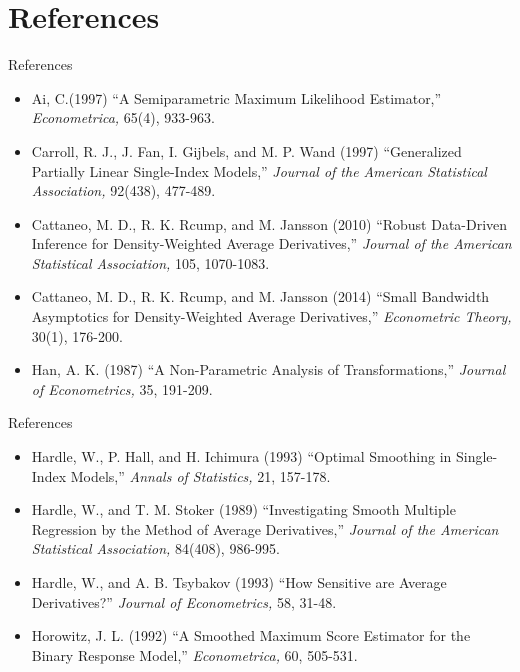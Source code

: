 \documentclass[xcolor=svgnames,dvipdfmx,cjk]{beamer}
\theoremstyle{example}
\begin{document}
 
  
  
\section{References}
  


\begin{frame}{References}
\begin{itemize}
  \item Ai, C.(1997) 
        ``A Semiparametric Maximum Likelihood Estimator,''
        \textit{Econometrica,} 65(4), 933-963.
  \item Carroll, R. J., J. Fan, I. Gijbels, and M. P. Wand (1997)
        ``Generalized Partially Linear Single-Index Models,'' 
        \textit{Journal of the American Statistical Association,} 92(438), 477-489.
  \item Cattaneo, M. D., R. K. Rcump, and M. Jansson (2010)
        ``Robust Data-Driven Inference for Density-Weighted Average Derivatives,''
        \textit{Journal of the American Statistical Association,} 105, 1070-1083.
  \item Cattaneo, M. D., R. K. Rcump, and M. Jansson (2014)
        ``Small Bandwidth Asymptotics for Density-Weighted Average Derivatives,''
        \textit{Econometric Theory,} 30(1), 176-200.
  \item Han, A. K. (1987)
        ``A Non-Parametric Analysis of Transformations,''
        \textit{Journal of Econometrics,} 35, 191-209.
\end{itemize}
\end{frame}

\begin{frame}{References}
\begin{itemize}
  \item Hardle, W., P. Hall, and H. Ichimura (1993)
        ``Optimal Smoothing in Single-Index Models,'' 
        \textit{Annals of Statistics,} 21, 157-178.
  \item Hardle, W., and T. M. Stoker (1989)
        ``Investigating Smooth Multiple Regression by the Method of Average Derivatives,''
        \textit{Journal of the American Statistical Association,} 84(408), 986-995.
  \item Hardle, W., and A. B. Tsybakov (1993)
        ``How Sensitive are Average Derivatives?''
        \textit{Journal of Econometrics,} 58, 31-48.
  \item Horowitz, J. L. (1992)
        ``A Smoothed Maximum Score Estimator for the Binary Response Model,''
        \textit{Econometrica,} 60, 505-531.
\end{itemize}
\end{frame}
\end{document}
